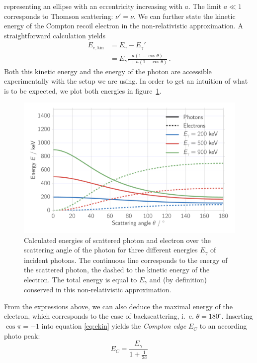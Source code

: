 representing an ellipse with an eccentricity increasing with $a$.\cite{siegbahn2012alpha} 
The limit $a \ll 1$ corresponds to Thomson scattering: $\nu' = \nu$. 
We can further state the kinetic energy of the Compton recoil electron in the non-relativistic approximation. A 
straightforward calculation yields\cite{siegbahn2012alpha} 
\begin{equation}
    \begin{split}
        E_{e, \text{kin}} &= E_\gamma - E_\gamma' \\
                     &=  E_\gamma \frac{a (1 - \cos\theta)}{1 + a(1 - \cos\theta)} \, .
        \label{eq:ekin}
    \end{split}
\end{equation}
Both this kinetic energy and the energy of the photon are accessible experimentally with the setup we are using. 
In order to get an intuition of what is to be expected, we plot both energies in figure~\ref{fig:theory_conservation}.

\begin{figure}[htpb]
    \centering
    \includegraphics[width=0.8\linewidth]{analysis/figures/theory_conservation}
    \caption{
        Calculated energies of scattered photon and electron over the scattering angle of the photon for three different
        energies $E_\gamma$ of incident photons.
        The continuous line corresponds to the energy of the scattered photon, the dashed to the kinetic energy of the
        electron. The total energy is equal to $E_\gamma$ and (by definition) conserved in this non-relativistic 
        approximation. 
        }
    \label{fig:theory_conservation}
\end{figure}

From the expressions above, we can also deduce the maximal energy of the electron, which corresponds to the case of 
backscattering, i.~e. $\theta = 180^\circ$. Inserting $\cos \pi = -1$ into equation \eqref{eq:ekin} yields the
\textit{Compton edge} $ E_C$ to an according photo peak: 
\begin{equation}
    E_C = \frac{E_\gamma}{1 + \frac{1}{2a}}	
    \label{eq:e_max}
\end{equation}

